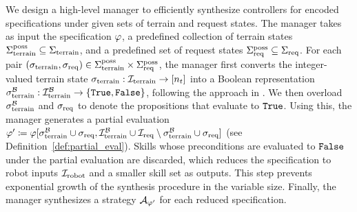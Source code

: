 We design a high-level manager to efficiently synthesize controllers for encoded specifications under given sets of terrain and request states. The manager takes as input the specification $\varphi$, a predefined collection of terrain states $\Sigma_{\textrm{terrain}}^{\textrm{poss}} \subseteq \Sigma_{\textrm{terrain}}$, and a predefined set of request states $\Sigma_{\textrm{req}}^{\textrm{poss}} \subseteq \Sigma_{\textrm{req}}$. For each pair $(\sigma_{\textrm{terrain}}, \sigma_{\textrm{req}}) \in \Sigma_{\textrm{terrain}}^{\textrm{poss}} \times \Sigma_{\textrm{req}}^{\textrm{poss}}$, the manager first converts the integer-valued terrain state $\sigma_{\textrm{terrain}}: {\mathcal I}_{\textrm{terrain}} \to [n_t]$ into a Boolean representation $\sigma_{\textrm{terrain}}^{{\mathcal B}}: {\mathcal I}_{\textrm{terrain}}^{{\mathcal B}} \to \{{\tt{True}}, {\tt{False}}\}$, following the approach in \citep{ehlers2016slugs}. We then overload $\sigma_{\textrm{terrain}}^{{\mathcal B}}$ and $\sigma_{\textrm{req}}$ to denote the propositions that evaluate to ${\tt{True}}$. Using this, the manager generates a partial evaluation $\varphi' \coloneqq \varphi[\sigma_{\textrm{terrain}}^{{\mathcal B}} \cup \sigma_{\textrm{req}}, {\mathcal I}_{\textrm{terrain}}^{{\mathcal B}} \cup {\mathcal I}_{\textrm{req}} \setminus \sigma_{\textrm{terrain}}^{{\mathcal B}} \cup \sigma_{\textrm{req}}]$ (see Definition~\ref{def:partial_eval}). Skills whose preconditions are evaluated to ${\tt{False}}$ under the partial evaluation are discarded, which reduces the specification to robot inputs ${\mathcal I}_{\textrm{robot}}$ and a smaller skill set as outputs. This step prevents exponential growth of the synthesis procedure in the variable size. Finally, the manager synthesizes a strategy ${\mathcal A}_{\varphi'}$ for each reduced specification.

